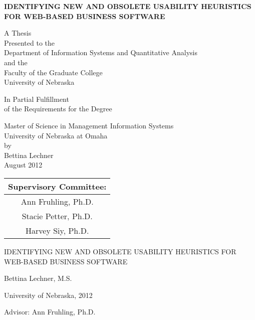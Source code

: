 \documentclass[letterpaper,12pt,oneside,final]{book}
\newcommand{\thesisTitle}{\uppercase{Identifying New and Obsolete Usability Heuristics for Web-Based Business Software}}
\begin{document}
\begin{titlepage}
	\begin{center}
		\vspace*{.5in}
		\textbf{\thesisTitle{}}
		
		\vspace*{.25in}
		
		A Thesis \\ Presented to the \\ Department of Information Systems and Quantitative Analysis \\ and the \\ Faculty of the Graduate College \\ University of Nebraska \\ \begin{singlespace}In Partial Fulfillment \\ of the Requirements for the Degree \end{singlespace} Master of Science in Management Information Systems \\ University of Nebraska at Omaha \\ by \\ Bettina Lechner \\ August 2012
		
		\vspace*{1in}
		
		\begin{table}[h!]
			\centering
			\begin{tabular}{c}
				Supervisory Committee: \\ \midrule\addlinespace[6pt]
				Ann Fruhling, Ph.D. \\ \addlinespace[8pt]
				Stacie Petter, Ph.D. \\ \addlinespace[8pt]
				Harvey Siy, Ph.D. \\
			\end{tabular}
		\end{table}
	\end{center}
\end{titlepage}

\frontmatter
{}
\newpage
\thispagestyle{empty}

\begin{center}
	\vspace*{.5in}
	
	\thesisTitle{}
	
	\vspace*{.25in}
	
	Bettina Lechner, M.S.
	
	University of Nebraska, 2012
	
	Advisor: Ann Fruhling, Ph.D.
	
	\vspace*{.25in}
\end{center}
\end{document}
